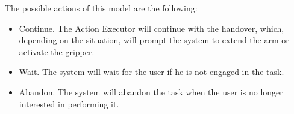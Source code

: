 The possible actions of this model are the following:
\begin{itemize}
\item Continue. The Action Executor will continue with the handover, which, depending on the situation, will prompt the system to extend the arm or activate the gripper.
\item Wait. The system will wait for the user if he is not engaged in the task.
\item Abandon. The system will abandon the task when the user is no longer interested in performing it. 
\end{itemize} 


